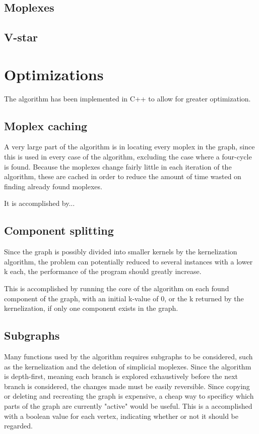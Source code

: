 \documentclass{article}
\begin{document}
		\subsection{Moplexes}

		\subsection{V-star}

	\section{Optimizations}
	The algorithm has been implemented in C++ to allow for greater optimization.

		\subsection{Moplex caching}
		A very large part of the algorithm is in locating every moplex in the graph, since this is used in every case of the algorithm, excluding the case where a four-cycle is found.
		Because the moplexes change fairly little in each iteration of the algorithm, these are cached in order to reduce the amount of time wasted on finding already found moplexes.

		It is accomplished by...

		\subsection{Component splitting}
		Since the graph is possibly divided into smaller kernels by the kernelization algorithm, the problem can potentially reduced to several instances with a lower k each, the performance of the program should greatly increase.

		This is accomplished by running the core of the algorithm on each found component of the graph, with an initial k-value of 0, or the k returned by the kernelization, if only one component exists in the graph.

		\subsection{Subgraphs}
		Many functions used by the algorithm requires subgraphs to be considered, such as the kernelization and the deletion of simplicial moplexes.
		Since the algorithm is depth-first, meaning each branch is explored exhaustively before the next branch is considered, the changes made must be easily reversible.
		Since copying or deleting and recreating the graph is expensive, a cheap way to specificy which parts of the graph are currently "active" would be useful.
		This is a accomplished with a boolean value for each vertex, indicating whether or not it should be regarded.
\end{document}
